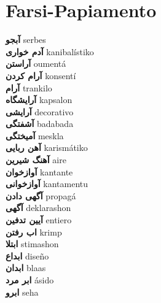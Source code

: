 \twocolumn
\chapter{Farsi-Papiamento}
\small
{}\textbf{ آبجو  } serbes \\
\textbf{ آدم خواری  } kanibalístiko \\
\textbf{ آراستن  } oumentá \\
\textbf{ آرام کردن  } konsentí \\
\textbf{ آرام  } trankilo \\
\textbf{ آرایشگاه  } kapsalon \\
\textbf{ آرایشی  } decorativo \\
\textbf{ آشفتگی  } badabada \\
\textbf{ آمیختگی  } meskla \\
\textbf{ آهن ربایی  } karismátiko \\
\textbf{ آهنگ شیرین  } aire \\
\textbf{ آوازخوان  } kantante \\
\textbf{ آوازخوانی  } kantamentu \\
\textbf{ آگهی دادن  } propagá \\
\textbf{ آگهی  } deklarashon \\
\textbf{ آیین تدفین  } entiero \\
\textbf{ اب رفتن  } krimp \\
\textbf{ ابتلا  } stimashon \\
\textbf{ ابداع  } diseño \\
\textbf{ ابدان  } blaas \\
\textbf{ ابر مرد  } ásido \\
\textbf{ ابرو  } seha \\
